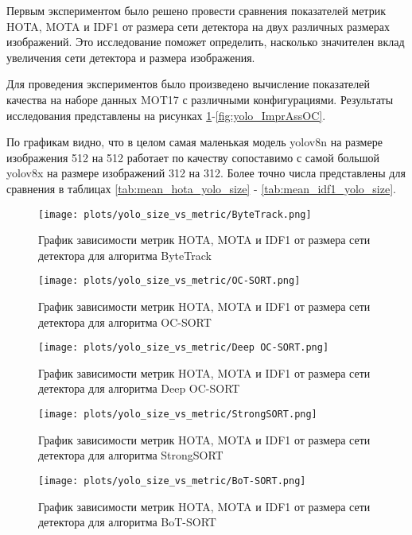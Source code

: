 Первым экспериментом было решено провести сравнения показателей метрик HOTA, MOTA и IDF1 от размера сети детектора на двух различных размерах изображений. Это исследование поможет определить, насколько значителен вклад увеличения сети детектора и размера изображения. 

Для проведения экспериментов было произведено вычисление показателей качества на наборе данных MOT17 с различными конфигурациями. Результаты исследования представлены на рисунках \ref{fig:yolo_ByteTrack}-\ref{fig:yolo_ImprAssOC}.

По графикам видно, что в целом самая маленькая модель yolov8n на размере изображения 512 на 512 работает по качеству сопоставимо с самой большой yolov8x на размере изображений 312 на 312. 
Более точно числа представлены для сравнения в таблицах \ref{tab:mean_hota_yolo_size} - \ref{tab:mean_idf1_yolo_size}.

\begin{figure}[ht]
    \centering
    \texttt{[image: plots/yolo\_size\_vs\_metric/ByteTrack.png]}
    \caption{График зависимости метрик HOTA, MOTA и IDF1 от размера сети детектора для алгоритма ByteTrack}
    \label{fig:yolo_ByteTrack}
\end{figure}

\begin{figure}[ht]
    \centering
    \texttt{[image: plots/yolo\_size\_vs\_metric/OC-SORT.png]}
    \caption{График зависимости метрик HOTA, MOTA и IDF1 от размера сети детектора для алгоритма OC-SORT}
    \label{fig:yolo_OC-SORT}
\end{figure}

\begin{figure}[ht]
    \centering
    \texttt{[image: plots/yolo\_size\_vs\_metric/Deep OC-SORT.png]}
    \caption{График зависимости метрик HOTA, MOTA и IDF1 от размера сети детектора для алгоритма Deep OC-SORT}
    \label{fig:yolo_Deep OC-SORT}
\end{figure}

\begin{figure}[ht]
    \centering
    \texttt{[image: plots/yolo\_size\_vs\_metric/StrongSORT.png]}
    \caption{График зависимости метрик HOTA, MOTA и IDF1 от размера сети детектора для алгоритма StrongSORT}
    \label{fig:yolo_StrongSORT}
\end{figure}

\begin{figure}[ht]
    \centering
    \texttt{[image: plots/yolo\_size\_vs\_metric/BoT-SORT.png]}
    \caption{График зависимости метрик HOTA, MOTA и IDF1 от размера сети детектора для алгоритма BoT-SORT}
    \label{fig:yolo_BoT-SORT}
\end{figure}

